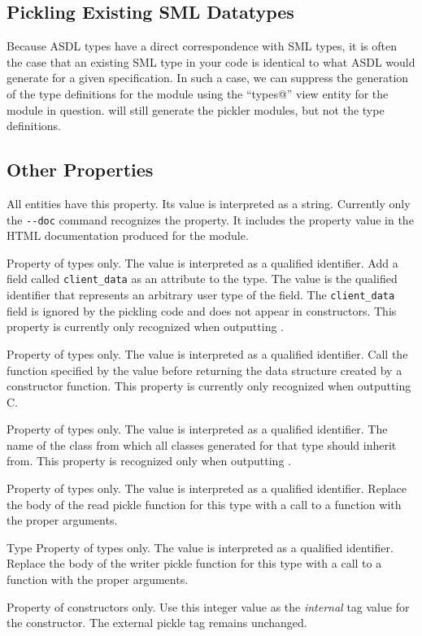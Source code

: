 \subsection{Pickling Existing SML Datatypes}

Because ASDL types have a direct correspondence with SML types, it is often
the case that an existing SML type in your code is identical to what
ASDL would generate for a given specification.
In such a case, we can suppress the generation of the type definitions
for the module using the ``\lstinline@suppress types@'' view entity
for the module in question.
\asdlgen{} will still generate the pickler modules, but not the type
definitions.

\subsection{Other Properties}
\begin{description}
    All entities have this property. Its value is interpreted as a
    string. Currently only the \lstinline!--doc! command recognizes the
    property. It includes the property value in the HTML documentation
    produced for the module.

    Property of types only.	The value is interpreted as a qualified 
    identifier. Add a field called \lstinline!client_data! as an
    attribute to the type. The value is the qualified identifier that
    represents an arbitrary user type of the field. The \lstinline!client_data!
    field is ignored by the pickling code and does not appear in
    constructors. This property is currently only recognized when
    outputting \Cplusplus{}.

    Property of types only. The value is interpreted as a qualified
    identifier. Call the function specified by the value before
    returning the data structure created by a constructor function.
    This property is currently only recognized when outputting C.

    Property of types only. The value is interpreted as a qualified
    identifier. The name of the class from which all classes generated
    for that type should inherit from. This property is recognized only
    when outputting \Cplusplus{}.
    
   Property of types only. The value is interpreted as a qualified
   identifier.  Replace the body of the read pickle function for this
   type with a call to a function with the proper arguments. 

  Type
   Property of types only. The value is interpreted as a qualified
   identifier.  Replace the body of the writer pickle function for this
   type with a call to a function with the proper arguments. 

   Property of constructors only.
   Use this integer value as the \emph{internal} tag value for the
   constructor. The external pickle tag remains unchanged. 

\end{description}%
